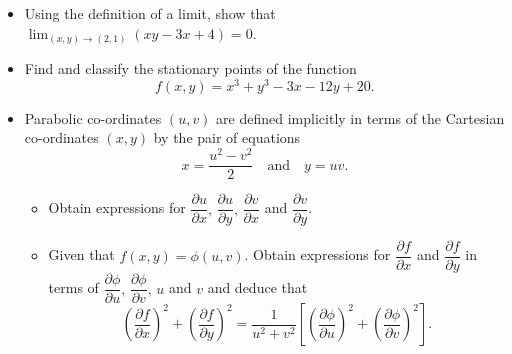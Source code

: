 \documentclass[12pt]{uz-exame}
\begin{document}
\begin{question}
\begin{itemize}
\item[(a)] Using the definition of a limit, show that $\displaystyle \lim _{(x,y)\rightarrow (2,1)}(xy-3x+4)=0$. 
\item[(b)] Find and classify the stationary points of the function \[f(x,y)=x^3+y^3-3x-12y+20.\] 
\item[(c)] Parabolic co-ordinates $(u,v)$ are defined implicitly in terms of the Cartesian co-ordinates $(x,y)$ by the pair of equations
\[x=\dfrac{u^2-v^2}{2} \quad \mbox{and}\quad y=uv.\]
\begin{itemize}
\item[(i)] Obtain expressions for $\dfrac{\partial u}{\partial x},\, \dfrac{\partial u}{\partial y} , \, \dfrac{\partial v}{\partial x}$ and $\dfrac{\partial v}{\partial y}$. 
\item[(ii)] Given that $f(x,y)=\phi (u,v)$. Obtain expressions for $\dfrac{\partial f}{\partial x}$ and $\dfrac{\partial f}{\partial y}$ in terms of $\dfrac{\partial \phi}{\partial u}, \, \dfrac{\partial \phi}{\partial v}, \, u$ and $v$ and deduce that  \[\left(\dfrac{\partial f}{\partial x}\right)^2+\left(\dfrac{\partial f}{\partial y}\right)^2=\dfrac{1}{u^2+v^2}\left[\left(\dfrac{\partial \phi}{\partial u}\right)^2+\left(\dfrac{\partial \phi}{\partial v}\right)^2\right].\]
\end{itemize}
\end{itemize}
\end{question}
\end{document}
